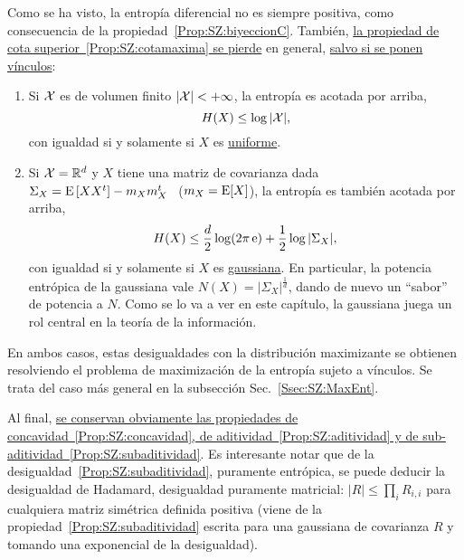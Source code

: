 Como  se  ha visto,  la  entrop\'ia diferencial  no  es  siempre positiva,  como
consecuencia de la propiedad~\ref{Prop:SZ:biyeccionC}.  Tambi\'en, \underline{la
  propiedad  de cota  superior~\ref{Prop:SZ:cotamaxima} se  pierde}  en general,
\underline{salvo si se ponen v\'inculos}:
%
\begin{propiedadesC}\setcounter{enumi}{\value{PropCotamaxima}}
\item
  \begin{enumerate}
  \item\label{Prop:SZ:cotamaximauniforme} Si $\mathcal{X}$ es de volumen finito $|\mathcal{X}| < +
    \infty$, la entrop\'ia es acotada por arriba,
    \[
    H(X) \le \log |\mathcal{X}|,
    \]
    con igualdad si y solamente si $X$ es \underline{uniforme}.
  \item\label{Prop:SZ:cotamaximagaussiana}  Si  $\mathcal{X} =\mathbb{R}^d$  y  $X$ tiene  una
    matriz  de covarianza  dada \  $\Sigma_X =  \operatorname{E}\left[ X  X^t \right]  - m_X
    m_X^t$ \ ($m_X = \operatorname{E}[X]$), la entrop\'ia es tambi\'en acotada por arriba,
    \[
    H(X) \le \frac{d}{2} \log(2 \pi \operatorname{e}) + \frac12 \log |\Sigma_X|,
    \]
    con igualdad si y solamente si $X$ es \underline{gaussiana}.  En particular,
    la  potencia  entr\'opica de  la  gaussiana  vale  $N(X) =  \left|  \Sigma_X
    \right|^{\frac1d}$, dando de nuevo un  ``sabor'' de potencia a $N$.  Como se
    lo va  a ver en  este cap\'itulo,  la gaussiana juega  un rol central  en la
    teor\'ia de la informaci\'on.
  \end{enumerate}
  En  ambos casos,  estas  desigualdades con  la  distribuci\'on maximizante  se
  obtienen resolviendo el  problema de maximizaci\'on de la  entrop\'ia sujeto a
  v\'inculos.    Se  trata   del   caso  m\'as   general   en  la   subsecci\'on
  Sec.~\ref{Ssec:SZ:MaxEnt}.
\end{propiedadesC}

Al    final,   \underline{se   conservan    obviamente   las    propiedades   de
  concavidad~\ref{Prop:SZ:concavidad},  de aditividad~\ref{Prop:SZ:aditividad} y
  de sub-aditividad~\ref{Prop:SZ:subaditividad}}.   Es interesante notar  que de
la  desigualdad~\ref{Prop:SZ:subaditividad},  puramente  entr\'opica,  se  puede
deducir la  desigualdad de Hadamard,  desigualdad puramente matricial:  $|R| \le
\prod_i R_{i,i}$ para cualquiera  matriz sim\'etrica definida positiva (viene de
la   propiedad~\ref{Prop:SZ:subaditividad}  escrita   para   una  gaussiana   de
covarianza $R$ y tomando una exponencial de la desigualdad).

